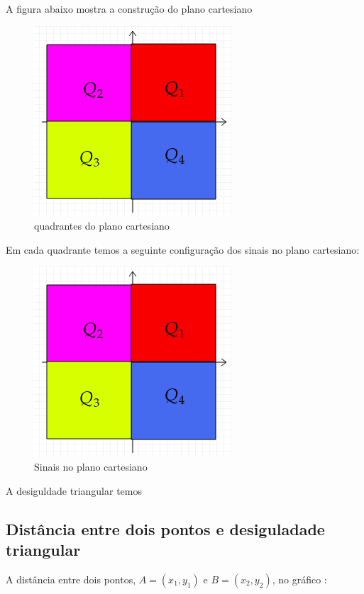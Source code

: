 \begin{multicols*}{2}
    A figura abaixo mostra a construção do plano cartesiano
    \begin{figure}[H]
        \centering
        \caption{quadrantes do plano cartesiano}
        \includegraphics[scale=0.5]{assets/rafael/img28.png}
    \end{figure}
    Em cada quadrante temos a seguinte configuração dos sinais no plano cartesiano:
    \begin{figure}[H]
        \caption{Sinais no plano cartesiano}
        \centering
        \includegraphics[scale=0.5]{assets/rafael/img28.png}
    \end{figure}

    A desiguldade triangular temos
    \subsection*{Distância entre dois pontos e desiguladade triangular}


    A distância entre dois pontos, $A = (x_1,y_1)$ e $B = (x_2,y_2)$, no gráfico :




\end{multicols*}

